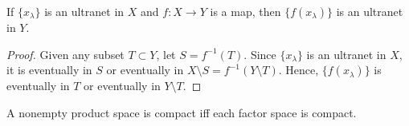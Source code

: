 \begin{lemma}
    If $\{x_\lambda\}$ is an ultranet in $X$ and $f:X\to Y$ is a map, then $\{f(x_\lambda)\}$ is an ultranet in $Y$.
\end{lemma}
\begin{proof}
    Given any subset $T\subset Y$, let $S=f^{-1}(T)$. Since $\{x_\lambda\}$ is an ultranet in $X$, it is eventually in $S$ or eventually in $X\setminus S=f^{-1}(Y\setminus T)$. Hence, $\{f(x_\lambda)\}$ is eventually in $T$ or eventually in $Y\setminus T$.
\end{proof}

\begin{theorem}
    A nonempty product space is compact iff each factor space is compact.
\end{theorem}



